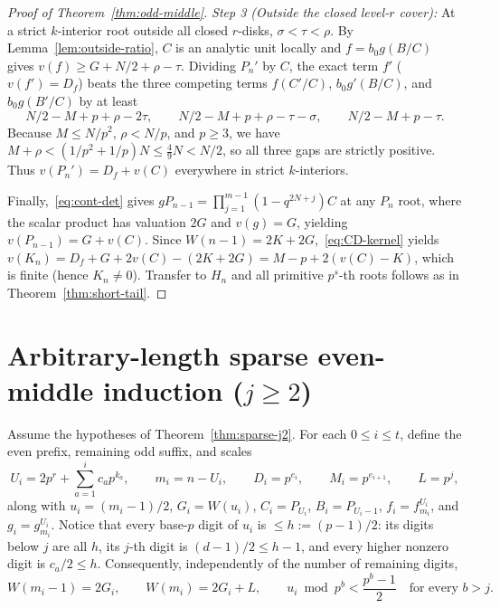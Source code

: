 \documentclass[11pt,reqno]{amsart}
\numberwithin{equation}{section}
\theoremstyle{definition}
\theoremstyle{remark}
\begin{document}
\begin{proof}[Proof of Theorem~\ref{thm:odd-middle}]
\smallskip
\noindent\emph{Step 3 (Outside the closed level-$r$ cover):}
At a strict $k$-interior root outside all closed $r$-disks, $\sigma < \tau < \rho$. By Lemma~\ref{lem:outside-ratio}, $C$ is an analytic unit locally and $f=b_0 g(B/C)$ gives $v(f) \ge G + N/2 + \rho - \tau$. Dividing $P_n'$ by $C$, the exact term $f'$ ($v(f')=D_f$) beats the three competing terms $f(C'/C)$, $b_0 g'(B/C)$, and $b_0 g(B'/C)$ by at least
\[
N/2 - M + p + \rho - 2\tau,\qquad N/2 - M + p + \rho - \tau - \sigma,\qquad N/2 - M + p - \tau.
\]
Because $M\le N/p^2$, $\rho < N/p$, and $p\ge 3$, we have $M+\rho < (1/p^2+1/p)N \le \frac{4}{9}N < N/2$, so all three gaps are strictly positive. Thus $v(P_n') = D_f + v(C)$ everywhere in strict $k$-interiors.

Finally,~\eqref{eq:cont-det} gives $g P_{n-1} = \prod_{j=1}^{m-1}(1-q^{2N+j})C$ at any $P_n$ root, where the scalar product has valuation $2G$ and $v(g)=G$, yielding $v(P_{n-1}) = G + v(C)$. Since $W(n-1)=2K+2G$,~\eqref{eq:CD-kernel} yields $v(K_n) = D_f + G + 2v(C) - (2K+2G) = M-p + 2(v(C)-K)$, which is finite (hence $K_n\ne 0$). Transfer to $H_n$ and all primitive $p^s$-th roots follows as in Theorem~\ref{thm:short-tail}.
\end{proof}

\section{Arbitrary-length sparse even-middle induction ($j\ge 2$)}
\label{sec:sparse-j2}

Assume the hypotheses of Theorem~\ref{thm:sparse-j2}. For each $0\le i\le t$, define the even prefix, remaining odd suffix, and scales
\begin{equation}
\label{eq:ind-vars}
U_i = 2p^r + \sum_{a=1}^i c_a p^{k_a},\qquad m_i = n - U_i,\qquad D_i = p^{e_i},\qquad M_i = p^{e_{i+1}},\qquad L = p^j,
\end{equation}
along with $u_i = (m_i-1)/2$, $G_i = W(u_i)$, $C_i = P_{U_i}$, $B_i = P_{U_i-1}$, $f_i = f_{m_i}^{U_i}$, and $g_i = g_{m_i}^{U_i}$. Notice that every base-$p$ digit of $u_i$ is $\le h := (p-1)/2$: its digits below $j$ are all $h$, its $j$-th digit is $(d-1)/2 \le h-1$, and every higher nonzero digit is $c_a/2 \le h$. Consequently, independently of the number of remaining digits,
\begin{equation}
\label{eq:sparse-balance}
W(m_i-1) = 2G_i,\qquad W(m_i) = 2G_i + L,\qquad u_i\bmod p^b < \frac{p^b-1}{2}\quad\text{for every } b > j.
\end{equation}
\end{document}
